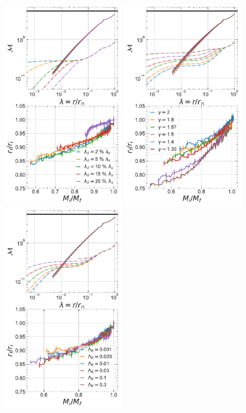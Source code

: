 \begin{figure}[htbp]
\centering
\includegraphics[height=9cm,trim={0 0cm 0.2cm 0},clip]{plots/relx_reln_shocked_vary-lamdish.pdf}
\includegraphics[height=9cm,trim={2.2cm 0 0.2cm 0},clip]{plots/relx_reln_shocked_vary-gam.pdf}
\includegraphics[height=9cm,trim={2.2cm 0 0.2cm 0},clip]{plots/relx_reln_shocked_vary-cooling.pdf}

\end{figure}
